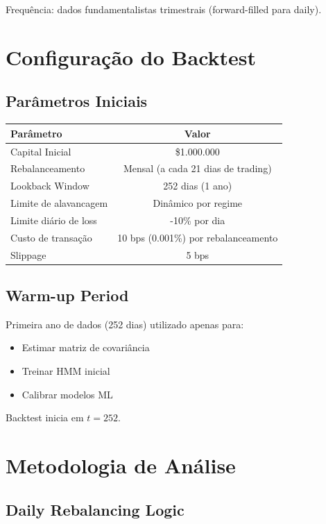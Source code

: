\documentclass[12pt,a4paper]{article}
\begin{document}
Frequência: dados fundamentalistas trimestrais (forward-filled para daily).

\section{Configuração do Backtest}

\subsection{Parâmetros Iniciais}

\begin{table}[h]
\centering
\begin{tabular}{|l|c|}
\hline
\textbf{Parâmetro} & \textbf{Valor} \\
\hline
Capital Inicial & \$1.000.000 \\
Rebalanceamento & Mensal (a cada 21 dias de trading) \\
Lookback Window & 252 dias (1 ano) \\
Limite de alavancagem & Dinâmico por regime \\
Limite diário de loss & -10\% por dia \\
Custo de transação & 10 bps (0.001\%) por rebalanceamento \\
Slippage & 5 bps \\
\hline
\end{tabular}
\end{table}

\subsection{Warm-up Period}

Primeira ano de dados (252 dias) utilizado apenas para:
\begin{itemize}
    \item Estimar matriz de covariância
    \item Treinar HMM inicial
    \item Calibrar modelos ML
\end{itemize}

Backtest inicia em $t = 252$.

\section{Metodologia de Análise}

\subsection{Daily Rebalancing Logic}
\end{document}
